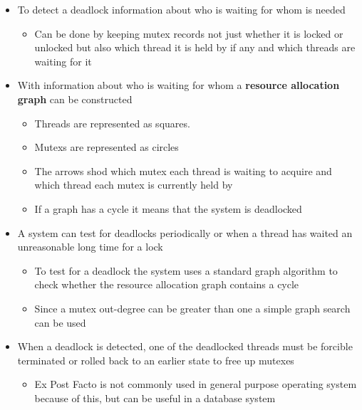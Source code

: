 \documentclass[11pt]{article}
\providecommand{\tightlist}{%
      \setlength{\itemsep}{0pt}\setlength{\parskip}{0pt}}
\begin{document}
\begin{itemize}
\tightlist
\item
  To detect a deadlock information about who is waiting for whom is
  needed

  \begin{itemize}
  \tightlist
  \item
    Can be done by keeping mutex records not just whether it is locked
    or unlocked but also which thread it is held by if any and which
    threads are waiting for it
  \end{itemize}
\item
  With information about who is waiting for whom a \textbf{resource
  allocation graph} can be constructed

  \begin{itemize}
  \tightlist
  \item
    Threads are represented as squares.
  \item
    Mutexs are represented as circles
  \item
    The arrows shod which mutex each thread is waiting to acquire and
    which thread each mutex is currently held by
  \item
    If a graph has a cycle it means that the system is deadlocked
  \end{itemize}
\item
  A system can test for deadlocks periodically or when a thread has
  waited an unreasonable long time for a lock

  \begin{itemize}
  \tightlist
  \item
    To test for a deadlock the system uses a standard graph algorithm to
    check whether the resource allocation graph contains a cycle
  \item
    Since a mutex out-degree can be greater than one a simple graph
    search can be used
  \end{itemize}
\item
  When a deadlock is detected, one of the deadlocked threads must be
  forcible terminated or rolled back to an earlier state to free up
  mutexes

  \begin{itemize}
  \tightlist
  \item
    Ex Post Facto is not commonly used in general purpose operating
    system because of this, but can be useful in a database system
  \end{itemize}
\end{itemize}
\end{document}
